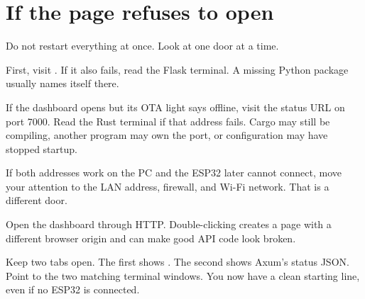 \section{If the page refuses to open}

Do not restart everything at once. Look at one door at a time.

First, visit . If it also fails, read the Flask terminal. A missing Python package usually names itself there.

If the dashboard opens but its OTA light says offline, visit the status URL on port 7000. Read the Rust terminal if that address fails. Cargo may still be compiling, another program may own the port, or configuration may have stopped startup.

If both addresses work on the PC and the ESP32 later cannot connect, move your attention to the LAN address, firewall, and Wi-Fi network. That is a different door.

Open the dashboard through HTTP. Double-clicking  creates a  page with a different browser origin and can make good API code look broken.

\begin{checkpoint}
Keep two tabs open. The first shows . The second shows Axum's status JSON. Point to the two matching terminal windows. You now have a clean starting line, even if no ESP32 is connected.
\end{checkpoint}
